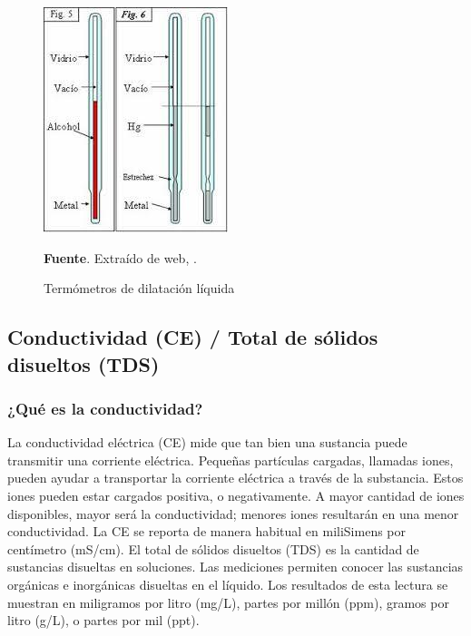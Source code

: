 \begin{itemize}
    \begin{figure}[ht]
        \centering
        \includegraphics[width=0.8\linewidth]{Imagenes/cap2/Dilatacion Liquida.jpg}\\
        \bigskip
        \caption { Term\'ometros de dilataci\'on l\'iquida  } \textbf{Fuente}. Extra\'ido de web, \cite{equipos_y_laboratorio_de_colombia_termometros_nodate}.
        \label{fig:dilatacion_li}
    \end{figure}
\end{itemize}

\subsection{Conductividad (CE) / Total de sólidos disueltos (TDS)}
\subsubsection{¿Qué es la conductividad?}
La conductividad eléctrica (CE) mide que tan bien una sustancia puede transmitir una corriente eléctrica. 
Pequeñas partículas cargadas, llamadas iones, pueden ayudar a transportar la corriente eléctrica a través de la substancia. 
Estos iones pueden estar cargados positiva, o negativamente. A mayor cantidad de iones disponibles, mayor será la conductividad; menores iones resultarán en una menor conductividad. 
La CE se reporta de manera habitual en miliSimens por centímetro (mS/cm).
El total de sólidos disueltos (TDS) es la cantidad de sustancias disueltas en soluciones. Las mediciones permiten conocer las sustancias orgánicas e inorgánicas disueltas en el líquido. 
Los resultados de esta lectura se muestran en miligramos por litro (mg/L), partes por mill\'on (ppm), gramos por litro (g/L), o partes por mil (ppt).

